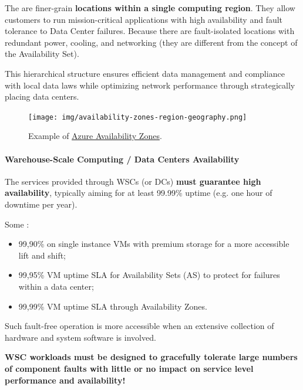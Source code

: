 \highspace
The  are finer-grain \textbf{locations within a single computing region}. They allow customers to run mission-critical applications with high availability and fault tolerance to Data Center failures. Because there are fault-isolated locations with redundant power, cooling, and networking (they are different from the concept of the Availability Set).

\highspace
This hierarchical structure ensures efficient data management and compliance with local data laws while optimizing network performance through strategically placing data centers.

\begin{figure}[!htp]
    \centering
    \texttt{[image: img/availability-zones-region-geography.png]}
    \caption{Example of \href{https://learn.microsoft.com/en-us/azure/reliability/availability-zones-overview?tabs=azure-cli}{Azure Availability Zones}.}
\end{figure}

\newpage

\paragraph{Warehouse-Scale Computing / Data Centers Availability}

The services provided through WSCs (or DCs) \textbf{must guarantee high availability}, typically aiming for at least 99.99\% uptime (e.g. one hour of downtime per year).

\highspace
Some :
\begin{itemize}
    \item 99,90\% on single instance VMs with premium storage for a more accessible lift and shift;
    
    \item 99,95\% VM uptime SLA for Availability Sets (AS) to protect for failures within a data center;

    \item 99,99\% VM uptime SLA through Availability Zones.
\end{itemize}
Such fault-free operation is more accessible when an extensive collection of hardware and system software is involved.

\highspace
\textbf{WSC workloads must be designed to gracefully tolerate large numbers of component faults with little or no impact on service level performance and availability!}

\hfill

